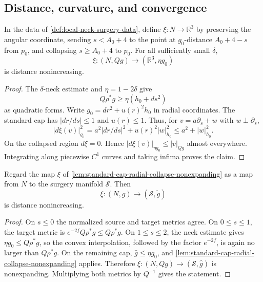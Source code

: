 \subsection{Distance, curvature, and convergence}

\begin{lemma}
\label{lem:standard-cap-radial-collapse-nonexpanding}
\notready
In the data of \ref{def:local-neck-surgery-data}, define
$\xi\colon N\to\mathbb R^3$ by preserving the angular coordinate,
sending $s<A_0+4$ to the point at $g_0$-distance $A_0+4-s$ from $p_0$,
and collapsing $s\ge A_0+4$ to $p_0$.  For all sufficiently small
$\delta$,
\[
 \xi\colon(N,Qg)\longrightarrow(\mathbb R^3,\eta g_0)
\]
is distance nonincreasing.
\end{lemma}

\begin{proof}
The $\delta$-neck estimate and $\eta=1-2\delta$ give
\[
 Q\rho^*g\ge\eta(h_0+ds^2)
\]
as quadratic forms.  Write $g_0=dr^2+u(r)^2h_0$ in radial coordinates.
The standard cap has $|dr/ds|\le1$ and $u(r)\le1$.  Thus, for
$v=a\partial_s+w$ with $w\perp\partial_s$,
\[
 |d\xi(v)|_{g_0}^2
 =a^2|dr/ds|^2+u(r)^2|w|_{h_0}^2
 \le a^2+|w|_{h_0}^2.
\]
On the collapsed region $d\xi=0$.  Hence
$|d\xi(v)|_{\eta g_0}\le|v|_{Qg}$ almost everywhere.  Integrating along
piecewise $C^1$ curves and taking infima proves the claim.
\end{proof}

\begin{lemma}
\label{lem:radial-surgery-map-nonexpanding}
\notready
Regard the map $\xi$ of
\ref{lem:standard-cap-radial-collapse-nonexpanding} as a map from $N$
to the surgery manifold $\mathcal S$.  Then
\[
 \xi\colon(N,g)\longrightarrow(\mathcal S,\widetilde g)
\]
is distance nonincreasing.
\end{lemma}

\begin{proof}
On $s\le0$ the normalized source and target metrics agree.  On
$0\le s\le1$, the target metric is $e^{-2f}Q\rho^*g\le Q\rho^*g$.
On $1\le s\le2$, the neck estimate gives
$\eta g_0\le Q\rho^*g$, so the convex interpolation, followed by the
factor $e^{-2f}$, is again no larger than $Q\rho^*g$.  On the remaining
cap, $\widehat g\le\eta g_0$, and
\ref{lem:standard-cap-radial-collapse-nonexpanding} applies.  Therefore
$\xi\colon(N,Qg)\to(\mathcal S,\widehat g)$ is nonexpanding.  Multiplying
both metrics by $Q^{-1}$ gives the statement.
\end{proof}

